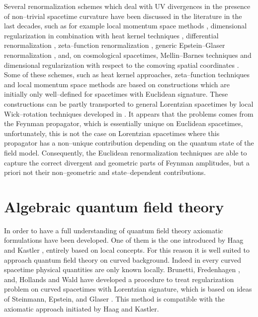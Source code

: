 \documentclass[11pt]{book}
\theoremstyle{break}
\begin{document}
Several renormalization schemes which deal with UV divergences in the presence of non--trivial spacetime curvature have been discussed in the literature in the last decades, such as for example local momentum space methods \cite{BUNCH_1981}, dimensional regularization in combination with heat kernel techniques \cite{LUSCHER_1982,TOMS_1982}, differential renormalization \cite{CHL_1995,PRANGE_1999}, zeta--function renormalization \cite{BILAL_2013}, generic Epstein--Glaser renormalization \cite{BF_2000,HW_2001,HW_2005}, and, on cosmological spacetimes, Mellin--Barnes techniques \cite{HOLLANDS_2010} and dimensional regularization with respect to the comoving spatial coordinates \cite{BCK_2010}. Some of these schemes, such as heat kernel approaches, zeta--function techniques and local momentum space methods are based on constructions which are initially only well--defined for spacetimes with Euclidean signature. These constructions can be partly transported to general Lorentzian spacetimes by local Wick--rotation techniques developed in \cite{MORETTI_2000}. It appears that the problems comes from the Feynman propagator, which is essentially unique on Euclidean spacetimes, unfortunately, this is not the case on Lorentzian spacetimes where this propagator has a non--unique contribution depending on the quantum state of the field model. Consequently, the Euclidean renormalization techniques are able to capture the correct divergent and geometric parts of Feynman amplitudes, but a priori not their non--geometric and state--dependent contributions.\par%


\section*{Algebraic quantum field theory}


In order to have a full understanding of quantum field theory axiomatic formulations have been developed. One of them is the one introduced by Haag and Kastler \cite{HK_1964}, entirely based on local concepts. For this reason it is well suited to approach quantum field theory on curved background. Indeed in every curved spacetime physical quantities are only known locally. Brunetti, Fredenhagen \cite{BF_2000}, and,  Hollands and Wald \cite{HW_2001,HW_2005} have developed a procedure to treat regularization problem on curved spacetimes with Lorentzian signature, which is based on ideas of Steinmann, Epstein, and Glaser \cite{STEINMANN_1971,EG_1973}. This method is compatible with the axiomatic approach initiated by Haag and Kastler.\par%
\end{document}
